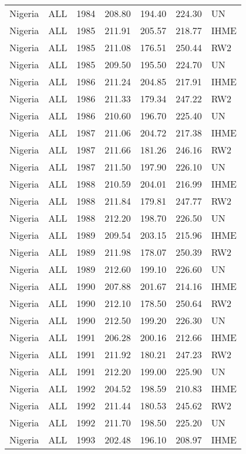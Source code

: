 \begin{longtable}{lllrrrl}
  Nigeria & ALL & 1984 & 208.80 & 194.40 & 224.30 & UN \\ 
  Nigeria & ALL & 1985 & 211.91 & 205.57 & 218.77 & IHME \\ 
  Nigeria & ALL & 1985 & 211.08 & 176.51 & 250.44 & RW2 \\ 
  Nigeria & ALL & 1985 & 209.50 & 195.50 & 224.70 & UN \\ 
  Nigeria & ALL & 1986 & 211.24 & 204.85 & 217.91 & IHME \\ 
  Nigeria & ALL & 1986 & 211.33 & 179.34 & 247.22 & RW2 \\ 
  Nigeria & ALL & 1986 & 210.60 & 196.70 & 225.40 & UN \\ 
  Nigeria & ALL & 1987 & 211.06 & 204.72 & 217.38 & IHME \\ 
  Nigeria & ALL & 1987 & 211.66 & 181.26 & 246.16 & RW2 \\ 
  Nigeria & ALL & 1987 & 211.50 & 197.90 & 226.10 & UN \\ 
  Nigeria & ALL & 1988 & 210.59 & 204.01 & 216.99 & IHME \\ 
  Nigeria & ALL & 1988 & 211.84 & 179.81 & 247.77 & RW2 \\ 
  Nigeria & ALL & 1988 & 212.20 & 198.70 & 226.50 & UN \\ 
  Nigeria & ALL & 1989 & 209.54 & 203.15 & 215.96 & IHME \\ 
  Nigeria & ALL & 1989 & 211.98 & 178.07 & 250.39 & RW2 \\ 
  Nigeria & ALL & 1989 & 212.60 & 199.10 & 226.60 & UN \\ 
  Nigeria & ALL & 1990 & 207.88 & 201.67 & 214.16 & IHME \\ 
  Nigeria & ALL & 1990 & 212.10 & 178.50 & 250.64 & RW2 \\ 
  Nigeria & ALL & 1990 & 212.50 & 199.20 & 226.30 & UN \\ 
  Nigeria & ALL & 1991 & 206.28 & 200.16 & 212.66 & IHME \\ 
  Nigeria & ALL & 1991 & 211.92 & 180.21 & 247.23 & RW2 \\ 
  Nigeria & ALL & 1991 & 212.20 & 199.00 & 225.90 & UN \\ 
  Nigeria & ALL & 1992 & 204.52 & 198.59 & 210.83 & IHME \\ 
  Nigeria & ALL & 1992 & 211.44 & 180.53 & 245.62 & RW2 \\ 
  Nigeria & ALL & 1992 & 211.70 & 198.50 & 225.20 & UN \\ 
  Nigeria & ALL & 1993 & 202.48 & 196.10 & 208.97 & IHME \\ 

\end{longtable}
